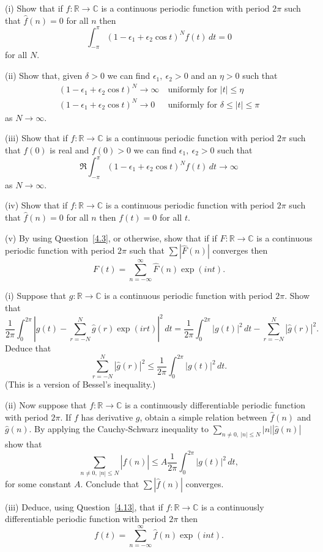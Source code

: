 \begin{question}\label{4.13}
(i)  Show that if
$f:{\mathbb R}\rightarrow{\mathbb C}$ is a
continuous periodic function with period $2\pi$
such that $\hat{f}(n)=0$ for all $n$
then
\[\int_{-\pi}^{\pi}(1-\epsilon_{1}+\epsilon_{2}\cos t)^{N}f(t)\,dt=0\]
for all $N$.

(ii) Show that, given $\delta>0$ we can find 
$\epsilon_{1},\ \epsilon_{2}>0$
and an $\eta>0$ such that
\begin{align*}
(1-\epsilon_{1}+\epsilon_{2}\cos t)^{N}\rightarrow\infty&\ \text{uniformly
for $|t|\leq\eta$}\\
(1-\epsilon_{1}+\epsilon_{2}\cos t)^{N}\rightarrow 0&\ \text{uniformly
for $\delta\leq |t|\leq\pi$}
\end{align*}
as $N\rightarrow\infty$.

(iii) Show that if $f:{\mathbb R}\rightarrow{\mathbb C}$ is a
continuous periodic function with period $2\pi$
such that $f(0)$ is real and $f(0)>0$ 
we can find $\epsilon_{1},\ \epsilon_{2}>0$ such that
\[\Re\int_{-\pi}^{\pi}(1-\epsilon_{1}+\epsilon_{2}\cos t)^{N}f(t)\,dt
\rightarrow\infty\]
as $N\rightarrow\infty$.

(iv) Show that if
$f:{\mathbb R}\rightarrow{\mathbb C}$ is a
continuous periodic function with period $2\pi$
such that $\hat{f}(n)=0$ for all $n$
then $f(t)=0$ for all $t$.

(v) By using Question~\ref{4.3}, or otherwise, show that if
if
$F:{\mathbb R}\rightarrow{\mathbb C}$ is a
continuous periodic function with period $2\pi$
such that $\sum |\hat{F}(n)|$ converges then
\[F(t)=\sum_{n=-\infty}^{\infty}\hat{F}(n)\exp (int).\]

\end{question}
\begin{question}
(i)  Suppose that
$g:{\mathbb R}\rightarrow{\mathbb C}$ is a
continuous periodic function with period $2\pi$.
Show that
\[\frac{1}{2\pi}\int_{0}^{2\pi}
\left|g(t)-\sum_{r=-N}^{N}\hat{g}(r)\exp(irt)\right|^{2}
\,dt
=\frac{1}{2\pi}\int_{0}^{2\pi}|g(t)|^{2}\,dt
-\sum_{r=-N}^{N}|\hat{g}(r)|^{2}.\]
Deduce that
\[\sum_{r=-N}^{N}|\hat{g}(r)|^{2}
\leq\frac{1}{2\pi}\int_{0}^{2\pi}|g(t)|^{2}\,dt.\]
(This is a version of Bessel's inequality.)

(ii) Now suppose that
$f:{\mathbb R}\rightarrow{\mathbb C}$ is a
continuously differentiable
periodic function with period $2\pi$.
If $f$ has derivative $g$, obtain a simple
relation between $\hat{f}(n)$ and $\hat{g}(n)$.
By applying the Cauchy-Schwarz inequality
to $\sum_{n\neq 0,\ |n|\leq N} |n||\hat{g}(n)|$ show that
\[\sum _{n\neq 0,\ |n|\leq N} |\hat{f}(n)|
\leq A \frac{1}{2\pi}\int_{0}^{2\pi}|g(t)|^{2}\,dt,\]
for some constant $A$.
Conclude that  $\sum |\hat{f}(n)|$ converges. 

(iii) Deduce, using Question~\ref{4.13}, that if
$f:{\mathbb R}\rightarrow{\mathbb C}$ is a
continuously differentiable
periodic function with period $2\pi$
then
\[f(t)=\sum_{n=-\infty}^{\infty}\hat{f}(n)\exp (int).\]

\end{question}
